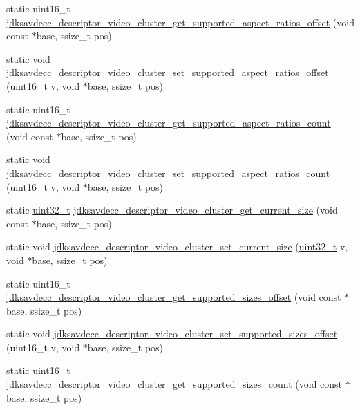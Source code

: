 \begin{DoxyCompactItemize}
\item 
static uint16\+\_\+t \hyperlink{group__descriptor__video__cluster_gace8d09c29a26d8761083fdd5be04bed0}{jdksavdecc\+\_\+descriptor\+\_\+video\+\_\+cluster\+\_\+get\+\_\+supported\+\_\+aspect\+\_\+ratios\+\_\+offset} (void const $\ast$base, ssize\+\_\+t pos)
\item 
static void \hyperlink{group__descriptor__video__cluster_ga5268f0f1cca2120270020ab983bbaa69}{jdksavdecc\+\_\+descriptor\+\_\+video\+\_\+cluster\+\_\+set\+\_\+supported\+\_\+aspect\+\_\+ratios\+\_\+offset} (uint16\+\_\+t v, void $\ast$base, ssize\+\_\+t pos)
\item 
static uint16\+\_\+t \hyperlink{group__descriptor__video__cluster_ga0e70f6f4772f4b5aa21781c0d5e18bdb}{jdksavdecc\+\_\+descriptor\+\_\+video\+\_\+cluster\+\_\+get\+\_\+supported\+\_\+aspect\+\_\+ratios\+\_\+count} (void const $\ast$base, ssize\+\_\+t pos)
\item 
static void \hyperlink{group__descriptor__video__cluster_ga1f7cdeef7a57630e8694a159140fb0f4}{jdksavdecc\+\_\+descriptor\+\_\+video\+\_\+cluster\+\_\+set\+\_\+supported\+\_\+aspect\+\_\+ratios\+\_\+count} (uint16\+\_\+t v, void $\ast$base, ssize\+\_\+t pos)
\item 
static \hyperlink{parse_8c_a6eb1e68cc391dd753bc8ce896dbb8315}{uint32\+\_\+t} \hyperlink{group__descriptor__video__cluster_gaaa012c6f59ad9fe252e99f8865df458e}{jdksavdecc\+\_\+descriptor\+\_\+video\+\_\+cluster\+\_\+get\+\_\+current\+\_\+size} (void const $\ast$base, ssize\+\_\+t pos)
\item 
static void \hyperlink{group__descriptor__video__cluster_ga6113d86ac6d7525a64b5fe054bd1e11e}{jdksavdecc\+\_\+descriptor\+\_\+video\+\_\+cluster\+\_\+set\+\_\+current\+\_\+size} (\hyperlink{parse_8c_a6eb1e68cc391dd753bc8ce896dbb8315}{uint32\+\_\+t} v, void $\ast$base, ssize\+\_\+t pos)
\item 
static uint16\+\_\+t \hyperlink{group__descriptor__video__cluster_ga54b5236c4ec197fff81a95ce9cc36e54}{jdksavdecc\+\_\+descriptor\+\_\+video\+\_\+cluster\+\_\+get\+\_\+supported\+\_\+sizes\+\_\+offset} (void const $\ast$base, ssize\+\_\+t pos)
\item 
static void \hyperlink{group__descriptor__video__cluster_ga25210e111227e412ab15475ccc6ab85d}{jdksavdecc\+\_\+descriptor\+\_\+video\+\_\+cluster\+\_\+set\+\_\+supported\+\_\+sizes\+\_\+offset} (uint16\+\_\+t v, void $\ast$base, ssize\+\_\+t pos)
\item 
static uint16\+\_\+t \hyperlink{group__descriptor__video__cluster_gab1dc5001ee29fc2f73280c976f20aa82}{jdksavdecc\+\_\+descriptor\+\_\+video\+\_\+cluster\+\_\+get\+\_\+supported\+\_\+sizes\+\_\+count} (void const $\ast$base, ssize\+\_\+t pos)

\end{DoxyCompactItemize}
